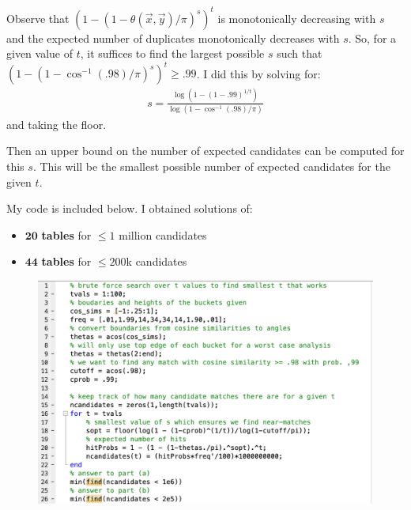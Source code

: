 \documentclass[11pt]{article}
\newcommand{\bv}[1]{\vec{#1}}
\begin{document}
	Observe that $(1 - (1 - \theta(\bv{x},\bv{y})/\pi)^s)^t$ is monotonically decreasing with $s$ and the expected number of duplicates monotonically decreases with $s$. So, for a given value of $t$, it suffices to find the largest possible $s$ such that  $(1 - (1 - \cos^{-1}(.98)/\pi)^s)^t \geq .99$. I did this by solving for:
	\begin{align*}
		s = \frac{\log(1 - (1-.99)^{1/t})}{\log(1-\cos^{-1}(.98)/\pi)}
	\end{align*}
	and taking the floor. 
	
	Then an upper bound on the number of expected candidates can be computed for this $s$. This will be the smallest possible number of expected candidates for the given $t$. 
	
	My code is included below. I obtained solutions of:
	\begin{itemize}
		\item $\mathbf{20}$ \textbf{tables} for $\leq 1$ million candidates
		\item  $\mathbf{44}$ \textbf{tables} for $\leq 200$k candidates
	\end{itemize}
	
	\begin{figure}
	\includegraphics[width=\textwidth]{matlabCode.png}
	\end{figure}
	
\end{document}
